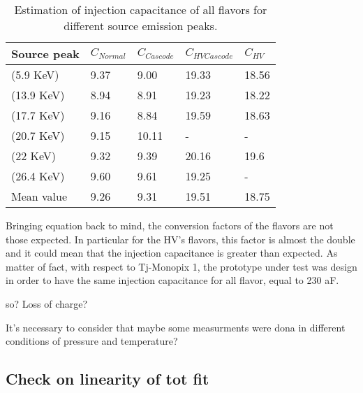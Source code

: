 \begin{table}[h!]
\centering
\begin{tabular}{>{} C{2.8cm}|C{1.7cm}|C{1.8cm}|C{1.7cm}|C{1.7cm}}
Source peak & $C_{Normal}$ & $C_{Cascode}$ & $C_{HV Cascode}$ & $C_{HV}$\\[2ex]
\hline
{} (5.9 KeV) & 9.37 & 9.00 & 19.33 & 18.56 \\[0.5ex]
\hline
{} (13.9 KeV) & 8.94 & 8.91 & 19.23 & 18.22 \\[0.5ex]
\hline
{} (17.7 KeV) & 9.16 & 8.84 & 19.59 & 18.63 \\[0.5ex]
\hline
{} (20.7 KeV) & 9.15 & 10.11 & - & -\\[0.5ex]
\hline
{} (22 KeV) & 9.32 & 9.39 & 20.16 & 19.6 \\[0.5ex]
\hline
{} (26.4 KeV) & 9.60 & 9.61 & 19.25 & - \\[1.5ex]
\hline
{}Mean value & 9.26 & 9.31 & 19.51 & 18.75 \\[1.5ex]
\end{tabular}
\caption{Estimation of injection capacitance of all flavors for different source emission peaks.}
\label{tab:cap_mean}
\end{table}


Bringing equation  back to mind, the conversion factors of the flavors are not those expected. In particular for the HV's flavors, this factor is almost the double and it could mean that the injection capacitance is greater than expected. As matter of fact, with respect to Tj-Monopix 1, the prototype under test was design in order to have the same injection capacitance for all flavor, equal to 230 aF.

so? Loss of charge?

It's necessary to consider that maybe some measurments were dona in different conditions of pressure and temperature?






\subsection{Check on linearity of tot fit}

